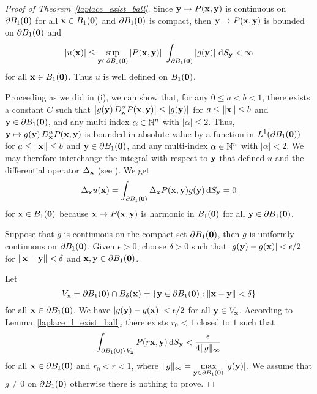 \begin{proof}[Proof of Theorem~\ref{laplace_exist_ball}]
 Since $\mathbf{y} \rightarrow P(\mathbf{x},\mathbf{y})$ is continuous
on $\partial B_1(\mathbf{0})$ for all $\mathbf{x} \in B_1(\mathbf{0})$ and
$\partial B_1(\mathbf{0})$ is compact, then
$\mathbf{y} \rightarrow P(\mathbf{x},\mathbf{y})$ is bounded on
$\partial B_1(\mathbf{0})$ and
\[
\left| u(\VEC{x}) \right| \leq \sup_{\VEC{y} \in \partial B_1(\VEC{0})}
\left| P(\VEC{x},\VEC{y}) \right| \ 
\int_{\partial B_1(\VEC{0})} \left| g(\VEC{y}) \right| \dss{S}{y}
< \infty
\]
for all $\mathbf{x} \in B_1(\mathbf{0})$.
Thus $u$ is well defined on $B_1(\mathbf{0})$.

 Proceeding as we did in (i), we can show that, for any
$0\leq a < b <1$, there exists a constant $C$ such that 
$\displaystyle \big|g(\mathbf{y})\, D^\alpha_{\mathbf{x}} P(\mathbf{x},\mathbf{y})\big|
\leq |g(\mathbf{y})|$ for $a \leq \|\mathbf{x} \| \leq b$ and
$\mathbf{y} \in \partial B_1(\mathbf{0})$, and any multi-index
$\alpha \in \mathbb{N}^n$ with $|\alpha|\leq 2$.  Thus,
$\displaystyle \mathbf{y} \mapsto g(\mathbf{y})\, D^\alpha_{\mathbf{x}}
P(\mathbf{x},\mathbf{y})$
is bounded in absolute value by a function in
$\displaystyle L^1(\partial B_1(\mathbf{0}))$ for
$a \leq \|\mathbf{x} \| \leq b$ and
$\mathbf{y} \in \partial B_1(\mathbf{0})$, and any multi-index
$\displaystyle \alpha \in \mathbb{N}^n$ with $|\alpha|<2$.  
We may therefore interchange the integral with respect to $\mathbf{y}$
that defined $u$ and the differential operator $\Delta_{\mathbf{x}}$
(see \cite{Flem}).  We get
\[
\Delta_{\mathbf{x}} u(\mathbf{x}) = \int_{\partial B_1(\mathbf{0})}
\Delta_{\mathbf{x}}P(\mathbf{x},\mathbf{y}) g(\mathbf{y}) \,\mathrm{d}{S}_{\mathbf{y}} = 0
\]
for $\mathbf{x} \in B_1(\mathbf{0})$
because $\mathbf{x} \mapsto P(\mathbf{x},\mathbf{y})$ is harmonic in
$B_1(\mathbf{0})$ for all $\mathbf{y} \in \partial B_1(\mathbf{0})$.

 Suppose that $g$ is continuous on the compact set
$\partial B_1(\mathbf{0})$, then $g$ is uniformly continuous on
$\partial B_1(\mathbf{0})$.  Given $\epsilon>0$, choose $\delta>0$ such
that
$\displaystyle |g(\mathbf{y}) - g(\mathbf{x})| < \epsilon/2$ for
$\|\mathbf{x}-\mathbf{y}\| < \delta$ and
$\mathbf{x},\mathbf{y} \in \partial B_1(\mathbf{0})$.

Let
\[
V_{\mathbf{x}} = \partial B_1(\mathbf{0}) \cap B_\delta(\mathbf{x})
= \left\{ \mathbf{y} \in \partial B_1(\mathbf{0})
: \|\mathbf{x} - \mathbf{y} \| < \delta \right\}
\]
for all $\mathbf{x} \in \partial B_1(\mathbf{0})$.  We have
$\displaystyle |g(\mathbf{y}) - g(\mathbf{x})| < \epsilon/2$ for all
$\mathbf{y} \in V_{\mathbf{x}}$.
According to Lemma~\ref{laplace_l_exist_ball}, there exists $r_0<1$
closed to $1$ such that
\[
\int_{\partial B_1(\mathbf{0})\setminus V_{\mathbf{x}}}
P(r\mathbf{x},\mathbf{y}) \,\mathrm{d}{S}_{\mathbf{y}} < \frac{\epsilon}{4\|g\|_\infty}
\]
for all $\mathbf{x} \in \partial B_1(\mathbf{0})$ and $r_0 < r < 1$, where
$\displaystyle \|g\|_{\infty} = \max_{\mathbf{y}\in\partial B_1(\mathbf{0})}
|g(\mathbf{y})|$.
We assume that $g \neq 0$ on $\partial B_1(\mathbf{0})$ otherwise there
is nothing to prove.


\end{proof}
